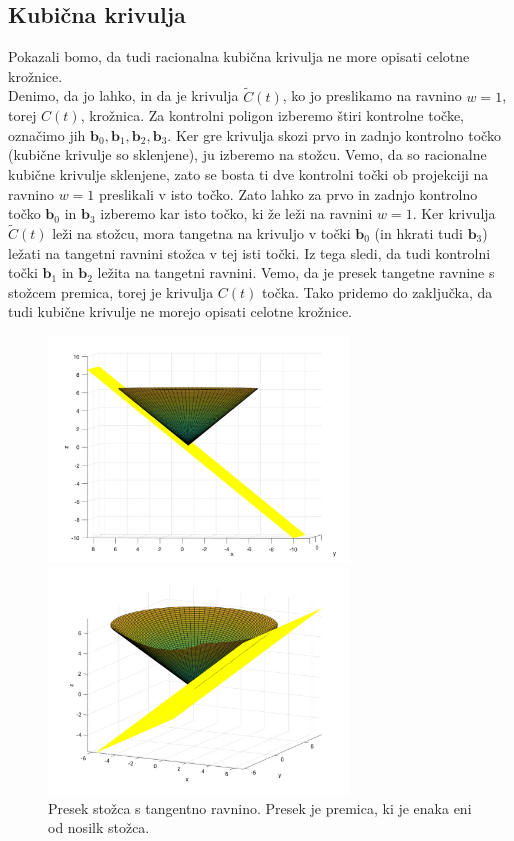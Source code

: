 \documentclass[a4paper,11pt]{article}
\theoremstyle{definition}
\theoremstyle{plain}
\begin{document}
\subsection{Kubična krivulja}
Pokazali bomo, da tudi racionalna kubična krivulja ne more opisati celotne krožnice. \\
Denimo, da jo lahko, in da je krivulja $\tilde{C}(t)$, ko jo preslikamo na ravnino $w = 1$, torej $C(t)$, krožnica.
Za kontrolni poligon izberemo štiri kontrolne točke, označimo jih $\boldsymbol{b}_0, \boldsymbol{b}_1, \boldsymbol{b}_2, \boldsymbol{b}_3$. Ker gre krivulja skozi prvo in zadnjo kontrolno točko (kubične krivulje so sklenjene), ju izberemo na stožcu.
Vemo, da so racionalne kubične krivulje sklenjene, zato se bosta ti dve kontrolni točki ob projekciji na ravnino $w = 1$ preslikali v isto točko. 
Zato lahko za prvo in zadnjo kontrolno točko $\boldsymbol{b}_0$ in $\boldsymbol{b}_3$ izberemo kar isto točko, ki že leži na ravnini $w = 1$. 
Ker krivulja $\tilde{C}(t)$ leži na stožcu, mora tangetna na krivuljo v točki $\boldsymbol{b}_0$ (in hkrati tudi $\boldsymbol{b}_3$) ležati na tangetni ravnini stožca v tej isti točki.
Iz tega sledi, da tudi kontrolni točki $\boldsymbol{b}_1$ in $\boldsymbol{b}_2$ ležita na tangetni ravnini. Vemo, da je presek tangetne ravnine s stožcem premica, torej je krivulja $C(t)$ točka.
Tako pridemo do zaključka, da tudi kubične krivulje ne morejo opisati celotne krožnice.
\begin{figure}[ht!]
    \begin{minipage}{0.5\textwidth}
        \centering
        \includegraphics[width=80mm]{stozec_tang_1.png}
    \end{minipage}\hfill
    \begin{minipage}{0.5\textwidth}
        \centering
        \includegraphics[width=80mm]{stozec_tang_2.png}
    \end{minipage}\hfill
    \caption{Presek stožca s tangentno ravnino. Presek je premica, ki je enaka eni od nosilk stožca.}
\end{figure}
\end{document}
